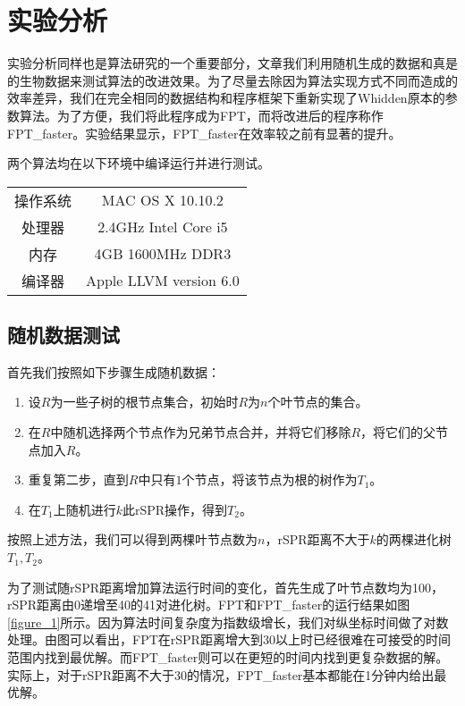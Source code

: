 
\chapter{实验分析}

实验分析同样也是算法研究的一个重要部分，文章我们利用随机生成的数据和真是的生物数据来测试算法的改进效果。为了尽量去除因为算法实现方式不同而造成的效率差异，我们在完全相同的数据结构和程序框架下重新实现了Whidden原本的参数算法。为了方便，我们将此程序成为FPT，而将改进后的程序称作FPT\_faster。实验结果显示，FPT\_faster在效率较之前有显著的提升。

两个算法均在以下环境中编译运行并进行测试。
\begin{center}
\begin{tabular}{ c c }
	\hline
  操作系统 & MAC OS X 10.10.2  \\
  处理器 & 2.4GHz Intel Core i5  \\
  内存 & 4GB 1600MHz DDR3  \\
  编译器 & Apple LLVM version 6.0 \\
	\hline
\end{tabular}
\end{center}

\section{随机数据测试}

首先我们按照如下步骤生成随机数据：
\begin{enumerate}
	\item 设$R$为一些子树的根节点集合，初始时$R$为$n$个叶节点的集合。
	\item 在$R$中随机选择两个节点作为兄弟节点合并，并将它们移除$R$，将它们的父节点加入$R$。
	\item 重复第二步，直到$R$中只有$1$个节点，将该节点为根的树作为$T_1$。
	\item 在$T_1$上随机进行$k$此rSPR操作，得到$T_2$。
\end{enumerate}

按照上述方法，我们可以得到两棵叶节点数为$n$，rSPR距离不大于$k$的两棵进化树$T_1,T_2$。

为了测试随rSPR距离增加算法运行时间的变化，首先生成了叶节点数均为100，rSPR距离由0递增至40的41对进化树。FPT和FPT\_faster的运行结果如图\ref{figure_1}所示。因为算法时间复杂度为指数级增长，我们对纵坐标时间做了对数处理。由图可以看出，FPT在rSPR距离增大到30以上时已经很难在可接受的时间范围内找到最优解。而FPT\_faster则可以在更短的时间内找到更复杂数据的解。实际上，对于rSPR距离不大于30的情况，FPT\_faster基本都能在1分钟内给出最优解。

